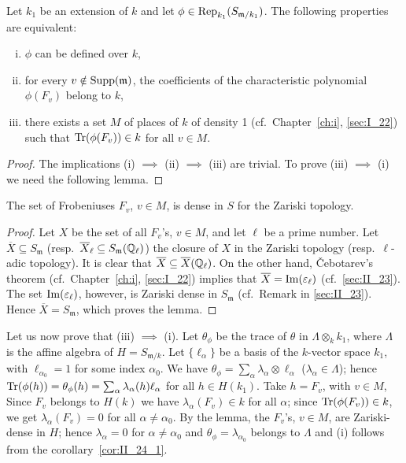 \begin{enumerate}[a), wide]
\begin{prop}\label{prop:II_24_2}
Let $k_1$ be an extension of $k$ and let $\phi \in
\operatorname{Rep}_{k_1}(S_{\mathfrak{m} /k_1})$. The following properties are equivalent:
\begin{enumerate}[(i)]
\item $\phi$ can be defined over $k$,
\item for every $v \notin \operatorname{Supp}(\mathfrak{m})$, the coefficients of the
	characteristic polynomial $\phi(F_v)$ belong to $k$,
\item there exists a set $M$ of places of $k$ of density 1 (cf.\ 
	Chapter~\ref{ch:i}, \ref{sec:I_22}) such that $\operatorname{Tr}(\phi(F_v)) \in k$
	for all $v \in M$.
\end{enumerate}
\end{prop}
\begin{proof}
The implications (i) $\implies$ (ii) $\implies$ (iii) are trivial.
To prove (iii) $\implies$ (i) we need the following lemma.
\end{proof}

\begin{lem}
	The set of Frobeniuses $F_v$, $v \in M$, is dense in $S$ for
	the Zariski topology.
\end{lem}
\begin{proof}
Let $X$ be the set of all $F_v$'s, $v \in M$, and let $\ell$ be a prime number.
Let $\overline{X} \subseteq S_{\mathfrak{m}}$ (resp.\ $\overline{X}_\ell
\subseteq S_{\mathfrak{m}}(\mathbb{Q}_\ell)$) the closure of $X$ in the Zariski
topology (resp.\ $\ell$-adic topology). It is clear that
\dpage
$\overline{X} \subseteq \overline{X}(\mathbb{Q}_\ell)$. On the other hand, \v
Cebotarev's theorem (cf.\ Chapter~\ref{ch:i}, \ref{sec:I_22}) implies that
$\overline{X} = \operatorname{Im}(\varepsilon_\ell)$ (cf.\ \ref{sec:II_23}). The set
$\operatorname{Im}(\varepsilon_\ell)$, however, is Zariski dense in $S_{\mathfrak{m}}$ (cf.\ 
Remark in \ref{sec:II_23}). Hence $\overline{X} = S_{\mathfrak{m}}$, which
proves the lemma.
\end{proof}

Let us now prove that (iii) $\implies$ (i). Let $\theta_\phi$ be the trace
of $\theta$ in $\Lambda \otimes_k k_1$, where $\Lambda$ is the affine algebra
of $H = S_{\mathfrak{m} /k}$. Let $\{ \ell_\alpha \}$ be a basis of the
$k$-vector space $k_1$, with $\ell_{\alpha_0} = 1$ for some index $\alpha_0$.
We have $\theta_\phi = \sum_{\alpha} \lambda_\alpha \otimes \ell_\alpha$
($\lambda_\alpha \in \Lambda$); hence $\operatorname{Tr}( \phi(h) ) = \theta_\phi(h) =
\sum_{\alpha} \lambda_\alpha(h) \ell_\alpha$ for all $h \in H(k_1)$. Take $h =
F_v$, with $v \in M$, Since $F_v$ belongs to $H(k)$ we have
$\lambda_\alpha(F_v) \in k$ for all $\alpha$; since $\operatorname{Tr}(\phi(F_v)) \in k$,
we get $\lambda_\alpha(F_v) = 0$ for all $\alpha \ne \alpha_0$. By the lemma,
the $F_v$'s, $v \in M$, are Zariski-dense in $H$; hence $\lambda_\alpha = 0$
for $\alpha \ne \alpha_0$ and $\theta_\phi = \lambda_{\alpha_0}$ belongs to
$\Lambda$ and (i) follows from the corollary~\ref{cor:II_24_1}.
\hfill
\qedsymbol
\end{enumerate}

